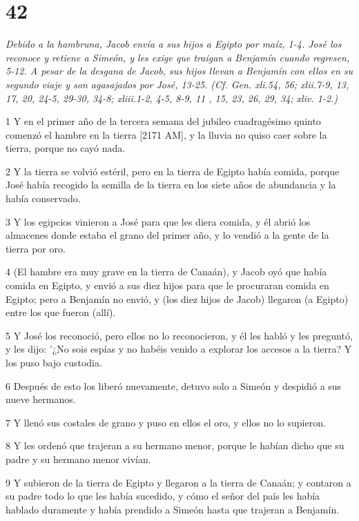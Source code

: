 \chapter{42}

\par \textit{Debido a la hambruna, Jacob envía a sus hijos a Egipto por maíz, 1-4. José los reconoce y retiene a Simeón, y les exige que traigan a Benjamín cuando regresen, 5-12. A pesar de la desgana de Jacob, sus hijos llevan a Benjamín con ellos en su segundo viaje y son agasajados por José, 13-25. (Cf. Gen. xli.54, 56; xlii.7-9, 13, 17, 20, 24-5, 29-30, 34-8; xliii.1-2, 4-5, 8-9, 11 , 15, 23, 26, 29, 34; xliv. 1-2.)}

\par 1 Y en el primer año de la tercera semana del jubileo cuadragésimo quinto comenzó el hambre en la tierra [2171 AM], y la lluvia no quiso caer sobre la tierra, porque no cayó nada.
\par 2 Y la tierra se volvió estéril, pero en la tierra de Egipto había comida, porque José había recogido la semilla de la tierra en los siete años de abundancia y la había conservado.
\par 3 Y los egipcios vinieron a José para que les diera comida, y él abrió los almacenes donde estaba el grano del primer año, y lo vendió a la gente de la tierra por oro.
\par 4 (El hambre era muy grave en la tierra de Canaán), y Jacob oyó que había comida en Egipto, y envió a sus diez hijos para que le procuraran comida en Egipto; pero a Benjamín no envió, y (los diez hijos de Jacob) llegaron (a Egipto) entre los que fueron (allí).
\par 5 Y José los reconoció, pero ellos no lo reconocieron, y él les habló y les preguntó, y les dijo: '¿No sois espías y no habéis venido a explorar los accesos a la tierra? Y los puso bajo custodia.
\par 6 Después de esto los liberó nuevamente, detuvo solo a Simeón y despidió a sus nueve hermanos.
\par 7 Y llenó sus costales de grano y puso en ellos el oro, y ellos no lo supieron.
\par 8 Y les ordenó que trajeran a su hermano menor, porque le habían dicho que su padre y su hermano menor vivían.
\par 9 Y subieron de la tierra de Egipto y llegaron a la tierra de Canaán; y contaron a su padre todo lo que les había sucedido, y cómo el señor del país les había hablado duramente y había prendido a Simeón hasta que trajeran a Benjamín.

